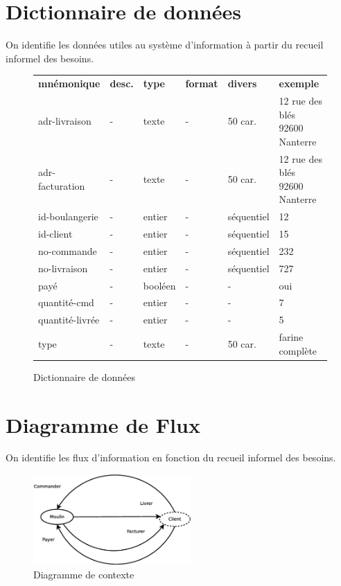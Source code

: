 \section*{Dictionnaire de données}

On identifie les données utiles au système d'information à partir du recueil informel des besoins.

\begin{figure}[!h]
\begin{tabular}{l l l l l l}
%
    \textbf{mnémonique} & \textbf{desc.} & \textbf{type} & \textbf{format} & \textbf{divers} & \textbf{exemple} \\
    adr-livraison            & - & texte    &  - & 50 car.    & 12 rue des blés 92600 Nanterre \\
    adr-facturation          & - & texte    &  - & 50 car.    & 12 rue des blés 92600 Nanterre \\
    id-boulangerie           & - & entier   &  - & séquentiel & 12 \\
    id-client                & - & entier   &  - & séquentiel & 15 \\
    no-commande              & - & entier   &  - & séquentiel & 232 \\
    no-livraison             & - & entier   &  - & séquentiel & 727 \\
    payé                     & - & booléen  &  - & -          & oui \\
    quantité-cmd             & - & entier   &  - & -          & 7 \\
    quantité-livrée          & - & entier   &  - & -          & 5 \\
    type                     & - & texte    &  - & 50 car.    & farine complète \\
%
\end{tabular}
    \caption{\label{DD} Dictionnaire de données}
\end{figure}

\newpage
\section*{Diagramme de Flux}

On identifie les flux d'information en fonction du recueil informel des besoins.

\begin{figure}[!htb]
    \begin{center}
    \includegraphics[width=6cm]{images/cc1_df1.eps}
    \caption{\label{cc1_df1} Diagramme de contexte}
    \end{center}
\end{figure}

